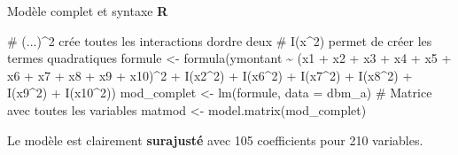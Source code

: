 \documentclass[
  ignorenonframetext,
]{beamer}
\newenvironment{Shaded}{\begin{snugshade}}{\end{snugshade}}
\newcommand{\AttributeTok}[1]{\textcolor[rgb]{0.40,0.45,0.13}{#1}}
\newcommand{\CommentTok}[1]{\textcolor[rgb]{0.37,0.37,0.37}{#1}}
\newcommand{\DecValTok}[1]{\textcolor[rgb]{0.68,0.00,0.00}{#1}}
\newcommand{\FunctionTok}[1]{\textcolor[rgb]{0.28,0.35,0.67}{#1}}
\newcommand{\NormalTok}[1]{\textcolor[rgb]{0.00,0.23,0.31}{#1}}
\newcommand{\OtherTok}[1]{\textcolor[rgb]{0.00,0.23,0.31}{#1}}
\newcommand{\SpecialCharTok}[1]{\textcolor[rgb]{0.37,0.37,0.37}{#1}}
\begin{document}
\begin{frame}[fragile]{Modèle complet et syntaxe \textbf{R}}
\protect\hypertarget{moduxe8le-complet-et-syntaxe-r}{}
\begin{Shaded}
\begin{Highlighting}[numbers=left,,]
\CommentTok{\# (...)\^{}2 crée toutes les interactions d\textquotesingle{}ordre deux}
\CommentTok{\# I(x\^{}2) permet de créer les termes quadratiques}
\NormalTok{formule }\OtherTok{\textless{}{-}} 
  \FunctionTok{formula}\NormalTok{(ymontant }\SpecialCharTok{\textasciitilde{}} 
\NormalTok{          (x1 }\SpecialCharTok{+}\NormalTok{ x2 }\SpecialCharTok{+}\NormalTok{ x3 }\SpecialCharTok{+}\NormalTok{ x4 }\SpecialCharTok{+}\NormalTok{ x5 }\SpecialCharTok{+} 
\NormalTok{             x6 }\SpecialCharTok{+}\NormalTok{ x7 }\SpecialCharTok{+}\NormalTok{ x8 }\SpecialCharTok{+}\NormalTok{ x9 }\SpecialCharTok{+}\NormalTok{ x10)}\SpecialCharTok{\^{}}\DecValTok{2} \SpecialCharTok{+} 
            \FunctionTok{I}\NormalTok{(x2}\SpecialCharTok{\^{}}\DecValTok{2}\NormalTok{) }\SpecialCharTok{+} \FunctionTok{I}\NormalTok{(x6}\SpecialCharTok{\^{}}\DecValTok{2}\NormalTok{) }\SpecialCharTok{+} \FunctionTok{I}\NormalTok{(x7}\SpecialCharTok{\^{}}\DecValTok{2}\NormalTok{) }\SpecialCharTok{+}
            \FunctionTok{I}\NormalTok{(x8}\SpecialCharTok{\^{}}\DecValTok{2}\NormalTok{) }\SpecialCharTok{+} \FunctionTok{I}\NormalTok{(x9}\SpecialCharTok{\^{}}\DecValTok{2}\NormalTok{) }\SpecialCharTok{+} \FunctionTok{I}\NormalTok{(x10}\SpecialCharTok{\^{}}\DecValTok{2}\NormalTok{))}
\NormalTok{mod\_complet }\OtherTok{\textless{}{-}} \FunctionTok{lm}\NormalTok{(formule, }\AttributeTok{data =}\NormalTok{ dbm\_a)}
\CommentTok{\# Matrice avec toutes les variables}
\NormalTok{matmod }\OtherTok{\textless{}{-}} \FunctionTok{model.matrix}\NormalTok{(mod\_complet)}
\end{Highlighting}
\end{Shaded}

Le modèle est clairement \textbf{surajusté} avec 105 coefficients pour
210 variables.
\end{frame}
\end{document}
